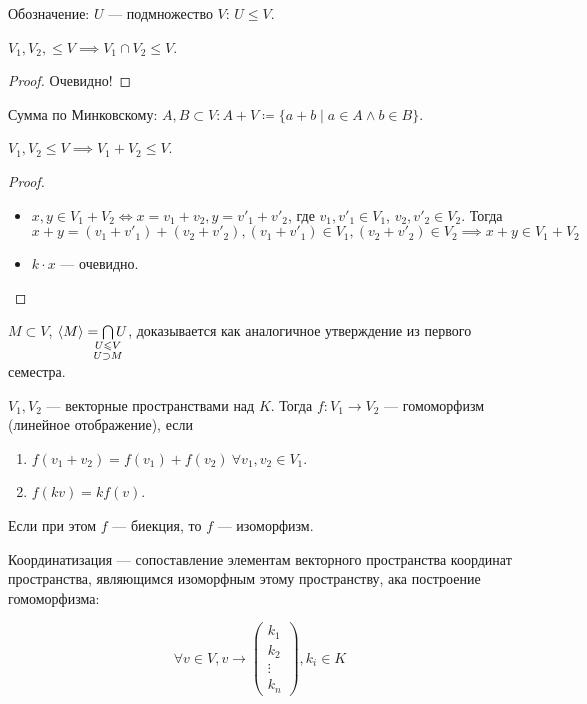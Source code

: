 Обозначение: $U$ --- подмножество  $V$:  $U \le V$.

\begin{statement}
    $V_1, V_2, \le V \implies V_1 \cap V_2 \le V$.
\end{statement}
\begin{proof}
    Очевидно!
\end{proof}
\begin{definition}
   Сумма по Минковскому: $A, B \subset V\!: A + V \coloneqq \{a + b \mid a \in A \land b \in B\}$. 
\end{definition}
\begin{statement}
    $V_1, V_2 \le V \implies V_1 + V_2 \le V$.
\end{statement}
\begin{proof}
    \slashn
    \begin{itemize}
	    \item $x, y \in V_1 + V_2 \iff x = v_1 + v_2, y = v'_1 + v'_2$, где $v_1, v'_1 \in V_1$, $v_2, v'_2 \in V_2$. Тогда $x + y = (v_1 + v'_1) + (v_2 + v'_2), (v_1 + v'_1) \in V_1, (v_2 + v'_2) \in V_2 \implies x + y \in V_1 + V_2$
        \item $k \cdot x$ --- очевидно.
    \end{itemize}
\end{proof}
\begin{remark}
    $M \subset V$,  $\langle M \rangle = \bigcap\limits_{\mathclap{\substack{U \le V \\ U \supset M}}} U$, доказывается как аналогичное утверждение из первого семестра.
\end{remark}
\begin{definition}
    $V_1, V_2$ --- векторные пространствами над $K$. Тогда  $f\!: V_1 \to V_2$ --- гомоморфизм (линейное отображение), если 
    \begin{enumerate}
        \item $f(v_1+v_2) = f(v_1) + f(v_2)\ \forall v_1, v_2 \in V_1$.
        \item $f(kv) = k f(v)$.
    \end{enumerate}

    Если при этом $f$ --- биекция, то  $f$ --- изоморфизм.
\end{definition}
\begin{definition}
    Координатизация --- сопоставление элементам векторного пространства координат пространства, являющимся изоморфным этому пространству, ака построение гомоморфизма:

$$
\forall v \in V, v \to \begin{pmatrix} k_1 \\ k_2 \\ \vdots \\ k_n \end{pmatrix} , k_i \in K
$$
\end{definition}

